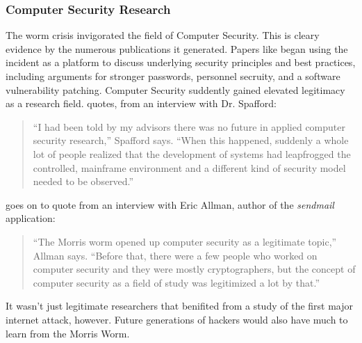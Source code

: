 \subsubsection*{Computer Security Research}
The worm crisis invigorated the field of Computer Security. This is cleary
evidence by the numerous publications it generated. Papers like
\cite{eichin_microscope_1989} began using the incident as a platform to discuss
underlying security principles and best practices, including arguments for
stronger passwords, personnel secruity, and a software vulnerability patching.
Computer Security suddently gained elevated legitimacy as a research field.
\cite{marsan_morris_2008} quotes, from an interview with Dr. Spafford:
\begin{quote}
``I had been told by my advisors there was no future in applied computer
security research,'' Spafford says. ``When this happened, suddenly a whole lot
of people realized that the development of systems had leapfrogged the
controlled, mainframe environment and a different kind of security model needed
to be observed.''
\end{quote}

\cite{marsan_morris_2008} goes on to quote from an interview with Eric Allman,
author of the \textit{sendmail} application:
\begin{quote}
``The Morris worm opened up computer security as a legitimate topic,'' Allman
says. ``Before that, there were a few people who worked on computer security
and they were mostly cryptographers, but the concept of computer security as a
field of study was legitimized a lot by that.''
\end{quote}

It wasn't just legitimate researchers that benifited from a study of the first
major internet attack, however. Future generations of hackers would
also have much to learn from the Morris Worm.
    